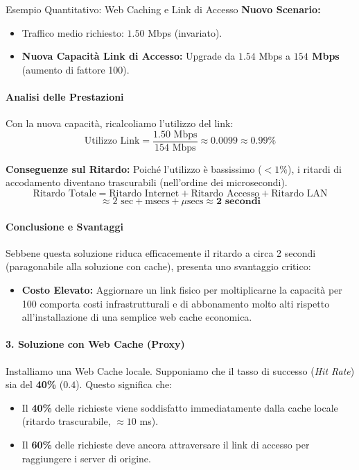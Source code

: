 \documentclass[a4paper,12pt]{report}
\begin{document}
\begin{esempiobox}{Esempio Quantitativo: Web Caching e Link di Accesso}
    \textbf{Nuovo Scenario:}
    \begin{itemize}
        \item Traffico medio richiesto: $1.50$ Mbps (invariato).
        \item \textbf{Nuova Capacità Link di Accesso:} Upgrade da $1.54$ Mbps a \textbf{$154$ Mbps} (aumento di fattore 100).
    \end{itemize}


    \paragraph{Analisi delle Prestazioni}
    Con la nuova capacità, ricalcoliamo l'utilizzo del link:
    \[
    \text{Utilizzo Link} = \frac{1.50 \text{ Mbps}}{154 \text{ Mbps}} \approx 0.0099 \approx \mathbf{0.99\%}
    \]
    
    \textbf{Conseguenze sul Ritardo:}
    Poiché l'utilizzo è bassissimo ($< 1\%$), i ritardi di accodamento diventano trascurabili (nell'ordine dei microsecondi).
    \[
    \text{Ritardo Totale} = \text{Ritardo Internet} + \text{Ritardo Accesso} + \text{Ritardo LAN}
    \]
    \[
    \approx 2 \text{ sec} + \text{msecs} + \mu\text{secs} \approx \mathbf{2 \text{ secondi}}
    \]

    \paragraph{Conclusione e Svantaggi}
    Sebbene questa soluzione riduca efficacemente il ritardo a circa 2 secondi (paragonabile alla soluzione con cache), presenta uno svantaggio critico:
    \begin{itemize}
        \item \textbf{Costo Elevato:} Aggiornare un link fisico per moltiplicarne la capacità per 100 comporta costi infrastrutturali e di abbonamento molto alti rispetto all'installazione di una semplice web cache economica.
    \end{itemize}
    

    \hrulefill
    

    \paragraph{3. Soluzione con Web Cache (Proxy)}
    Installiamo una Web Cache locale. Supponiamo che il tasso di successo (\textit{Hit Rate}) sia del \textbf{40\%} ($0.4$).
    Questo significa che:
    \begin{itemize}
        \item Il \textbf{40\%} delle richieste viene soddisfatto immediatamente dalla cache locale (ritardo trascurabile, $\approx 10$ ms).
        \item Il \textbf{60\%} delle richieste deve ancora attraversare il link di accesso per raggiungere i server di origine.
    \end{itemize}


\end{esempiobox}
\end{document}
